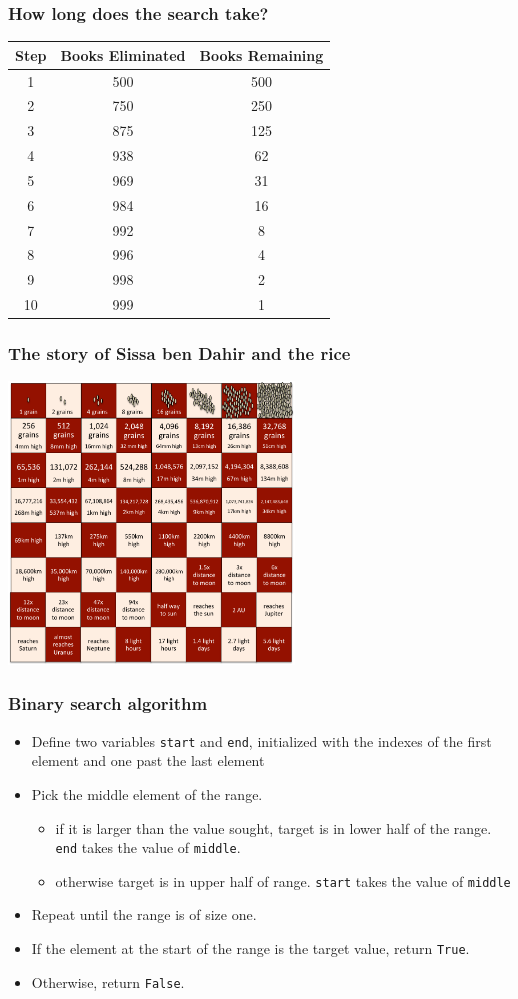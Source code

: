 \documentclass{beamer} %
\begin{document}
\begin{frame}
  \frametitle{How long does the search take?}
  \begin{center}
\begin{tabular}{ccc}
Step & Books Eliminated & Books Remaining\\
\hline
1 & 500 & 500\\
2 & 750 & 250\\
3 & 875 & 125\\
4 & 938 & 62\\
5 & 969 & 31\\
6 & 984 & 16\\
7 & 992 & 8\\
8 & 996 & 4\\
9 & 998 & 2\\
10 & 999 & 1
\end{tabular}
\end{center}
\end{frame}

\begin{frame}
  \frametitle{The story of Sissa ben Dahir and the rice}
  \centering
  \includegraphics[height=75mm]{assets/chessboard.pdf}
\end{frame}

\begin{frame}
\frametitle{Binary search algorithm} 

\begin{itemize}
\item Define two variables \texttt{start} and \texttt{end}, initialized with the indexes of the first element and one past the last element
\item Pick the middle element of the range.
  \begin{itemize}
  \item if it is larger than the value sought, target is in lower half of the range.  {\tt end} takes the value of \texttt{middle}.
  \item otherwise target is in upper half of range.  \texttt{start} takes the value of \texttt{middle}
  \end{itemize}
\item Repeat until the range is of size one.
\item If the element at the start of the range is the target value, return \texttt{True}. 
\item Otherwise, return \texttt{False}.
\end{itemize}

\end{frame}
\end{document}
